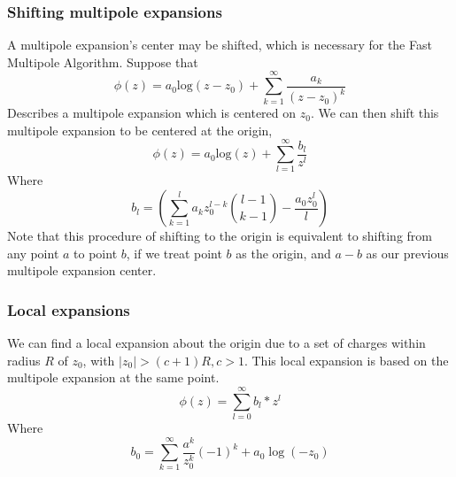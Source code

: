 \documentclass[pdftex,twoside,a4paper]{report}
\newcommand{\hs}{$\hspace{0.5cm}$}
\newcommand{\fma}{Fast Multipole Algorithm}
\begin{document}
\subsubsection{Shifting multipole expansions}
A multipole expansion's center may be shifted, which is necessary for the \fma{}. Suppose that
\begin{equation}
\phi(z) = a_0 \text{log}(z-z_0) + \sum_{k=1} ^{\infty} \frac{a_k}{(z-z_0)^k}
\label{eq:pre_shift_multipole}
\end{equation}
Describes a multipole expansion which is centered on $z_0$. We can then shift this multipole expansion to be centered at the origin,
\begin{equation}
\phi(z) = a_0 \text{log}(z) + \sum_{l=1} ^{\infty} \frac{b_l}{z^l}
\label{eq:shifted_multipole}
\end{equation}
Where
\begin{equation}
b_l = \left(\sum_{k=1} ^l a_k z_0^{l-k} \binom{l-1}{k-1} - \frac{a_0 z_0^l}{l} \right)
\label{eq:b_descr}
\end{equation}
Note that this procedure of shifting to the origin is equivalent to shifting from any point $a$ to point $b$, if we treat point $b$ as the origin, and $a-b$ as our previous multipole expansion center.
\subsubsection{Local expansions}
We can find a local expansion about the origin due to a set of charges within radius $R$ of $z_0$, with $|z_0| > (c+1)R, \hs c > 1$. This local expansion is based on the multipole expansion at the same point.
\begin{equation}
\phi(z) = \sum _{l=0} ^{\infty} b_l * z^l
\label{local_expansion}
\end{equation}
Where
\begin{equation}
b_0 = \sum_{k=1} ^{\infty} \frac{a^k}{z^k_0} (-1)^k + a_0 \log(-z_0)
\label{where_local_expansion}
\end{equation}
\end{document}
